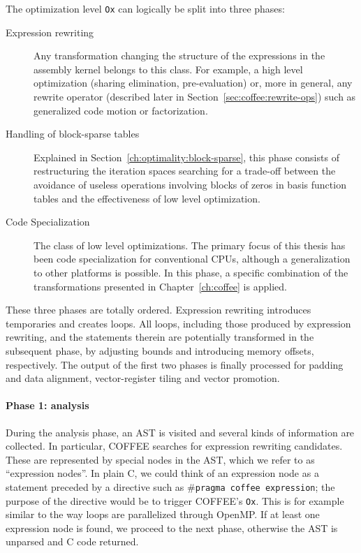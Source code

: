The optimization level \texttt{Ox} can logically be split into three phases:
\begin{description}
\item[Expression rewriting] Any transformation changing the structure of the expressions in the assembly kernel belongs to this class. For example, a high level optimization (sharing elimination, pre-evaluation) or, more in general, any rewrite operator (described later in Section~\ref{sec:coffee:rewrite-ops}) such as generalized code motion or factorization. 
\item[Handling of block-sparse tables] Explained in Section~\ref{ch:optimality:block-sparse}, this phase consists of restructuring the iteration spaces searching for a trade-off between the avoidance of useless operations involving blocks of zeros in basis function tables and the effectiveness of low level optimization.
\item[Code Specialization] The class of low level optimizations. The primary focus of this thesis has been code specialization for conventional CPUs, although a generalization to other platforms is possible. In this phase, a specific combination of the transformations presented in Chapter~\ref{ch:coffee} is applied.
\end{description}
These three phases are totally ordered. Expression rewriting introduces temporaries and creates loops. All loops, including those produced by expression rewriting, and the statements therein are potentially transformed in the subsequent phase, by adjusting bounds and introducing memory offsets, respectively. The output of the first two phases is finally processed for padding and data alignment, vector-register tiling and vector promotion.

\paragraph{Phase 1: analysis}
During the analysis phase, an AST is visited and several kinds of information are collected. In particular, COFFEE searches for expression rewriting candidates. These are represented by special nodes in the AST, which we refer to as ``expression nodes''. In plain C, we could think of an expression node as a statement preceded by a directive such as \texttt{$\#$pragma coffee expression}; the purpose of the directive would be to trigger COFFEE's \texttt{Ox}. This is for example similar to the way loops are parallelized through OpenMP. If at least one expression node is found, we proceed to the next phase, otherwise the AST is unparsed and C code returned.


